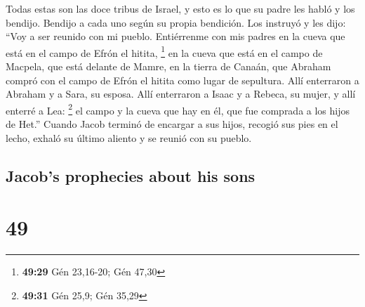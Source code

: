 \begin{paracol}{2}
 Todas estas son las doce tribus de Israel, y esto es lo
que su padre les habló y los bendijo. Bendijo a cada uno según su propia
bendición.  Los instruyó y les dijo: ``Voy a ser reunido
con mi pueblo. Entiérrenme con mis padres en la cueva que está en el
campo de Efrón el hitita, \footnote{\textbf{49:29} Gén 23,16-20; Gén
  47,30}  en la cueva que está en el campo de Macpela,
que está delante de Mamre, en la tierra de Canaán, que Abraham compró
con el campo de Efrón el hitita como lugar de sepultura. 
Allí enterraron a Abraham y a Sara, su esposa. Allí enterraron a Isaac y
a Rebeca, su mujer, y allí enterré a Lea: \footnote{\textbf{49:31} Gén
  25,9; Gén 35,29}  el campo y la cueva que hay en él,
que fue comprada a los hijos de Het.''  Cuando Jacob
terminó de encargar a sus hijos, recogió sus pies en el lecho, exhaló su
último aliento y se reunió con su pueblo.

\switchcolumn
\begin{otherlanguage}{english}

\hypertarget{jacobs-prophecies-about-his-sons}{%
\subsection{Jacob's prophecies about his
sons}\label{jacobs-prophecies-about-his-sons}}

\hypertarget{section-97}{%
\section{49}\label{section-97}}


\end{otherlanguage}
\end{paracol}
